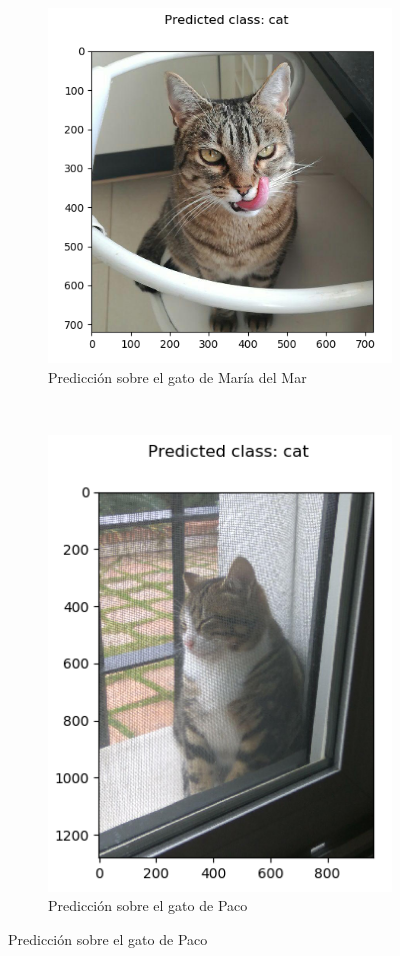 \documentclass[11pt]{article}
\theoremstyle{plain}
\theoremstyle{definition}
\begin{document}
\begin{figure}[ht!]
  \centering
  \begin{subfigure}[b]{0.5\textwidth}
    \centering
    \includegraphics[width=.8\textwidth]{imgs/predict_cat_correct}
    \caption{Predicción sobre el gato de María del Mar}
  \end{subfigure}%
  ~
  \begin{subfigure}[b]{0.5\textwidth}
    \centering
    \includegraphics[width=.8\textwidth]{imgs/predict_cat_correct_2}
    \caption{Predicción sobre el gato de Paco}
  \end{subfigure}
\end{figure}
\end{document}
